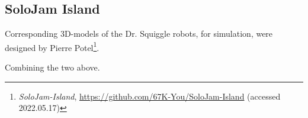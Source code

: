 	
	\subsection{SoloJam Island}
	\label{solojam_island}
	
	Corresponding 3D-models of the Dr. Squiggle robots, for simulation, were designed by Pierre Potel\footnote{\textit{SoloJam-Island}, \url{https://github.com/67K-You/SoloJam-Island} (accessed 2022.05.17)}.
	
	Combining the two above.

